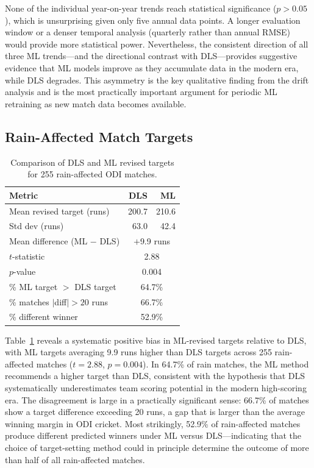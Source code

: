 \documentclass[10pt,a4paper,twocolumn]{article}
\begin{document}
None of the individual year-on-year trends reach statistical significance ($p > 0.05$), which is unsurprising given only five annual data points. A longer evaluation window or a denser temporal analysis (quarterly rather than annual RMSE) would provide more statistical power. Nevertheless, the consistent direction of all three ML trends---and the directional contrast with DLS---provides suggestive evidence that ML models improve as they accumulate data in the modern era, while DLS degrades. This asymmetry is the key qualitative finding from the drift analysis and is the most practically important argument for periodic ML retraining as new match data becomes available.

\subsection{Rain-Affected Match Targets}

\begin{table}[H]
\centering
\caption{Comparison of DLS and ML revised targets for 255 rain-affected ODI matches.}
\label{tab:rain}
\small
\begin{tabular}{@{}lrr@{}}
\toprule
\textbf{Metric} & \textbf{DLS} & \textbf{ML} \\
\midrule
Mean revised target (runs)  & 200.7 & 210.6 \\
Std dev (runs)               & 63.0  & 42.4  \\
Mean difference (ML $-$ DLS) & \multicolumn{2}{c}{$+$9.9 runs} \\
$t$-statistic                & \multicolumn{2}{c}{2.88} \\
$p$-value                    & \multicolumn{2}{c}{0.004} \\
\% ML target $>$ DLS target  & \multicolumn{2}{c}{64.7\%} \\
\% matches $|$diff$| > 20$ runs & \multicolumn{2}{c}{66.7\%} \\
\% different winner          & \multicolumn{2}{c}{52.9\%} \\
\bottomrule
\end{tabular}
\end{table}

Table~\ref{tab:rain} reveals a systematic positive bias in ML-revised targets relative to DLS, with ML targets averaging 9.9 runs higher than DLS targets across 255 rain-affected matches ($t = 2.88$, $p = 0.004$). In 64.7\% of rain matches, the ML method recommends a higher target than DLS, consistent with the hypothesis that DLS systematically underestimates team scoring potential in the modern high-scoring era. The disagreement is large in a practically significant sense: 66.7\% of matches show a target difference exceeding 20 runs, a gap that is larger than the average winning margin in ODI cricket. Most strikingly, 52.9\% of rain-affected matches produce different predicted winners under ML versus DLS---indicating that the choice of target-setting method could in principle determine the outcome of more than half of all rain-affected matches.
\end{document}
